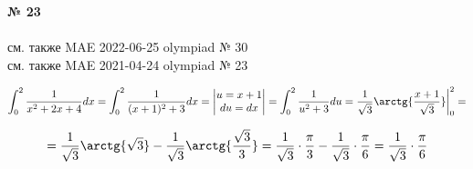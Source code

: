 \documentclass{article}
\begin{document}
\textbf{№ 23} 
\\
\\ см. также {\color{red}MAE} 2022-06-25 olympiad № 30
\\ см. также {\color{red}MAE} 2021-04-24 olympiad № 23

$$ \int_{0}^{2} \frac{1}{x^2+2x+4} dx 
= \int_{0}^{2} \frac{1}{(x+1)^2+3} dx 
= \begin{vmatrix} u = x+1 \\
                 du = dx \end{vmatrix} 
= \int_{0}^{2} \frac{1}{u^2+3} du 
= \frac{1}{\sqrt{3}} \arctg{\frac{x+1}{\sqrt{3}}} \bigg\vert_{0}^{2} 
= $$

$$ = \frac{1}{\sqrt{3}} \arctg{\sqrt{3}} - \frac{1}{\sqrt{3}} \arctg{\frac{\sqrt{3}}{3}}
= \frac{1}{\sqrt{3}} \cdot \frac{\pi}{3} - \frac{1}{\sqrt{3}} \cdot \frac{\pi}{6} 
= \frac{1}{\sqrt{3}} \cdot \frac{\pi}{6} $$
\end{document}
